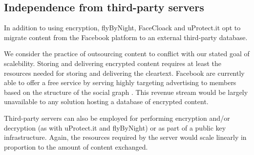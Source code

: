 \FloatBarrier
\subsection{Independence from third-party servers}


In addition to using encryption, flyByNight, FaceCloack and uProtect.it opt to migrate content from the Facebook platform to an external third-party database.

We consider the practice of outsourcing content to conflict with our stated goal of scalebility. Storing and delivering encrypted content requires at least the resources needed for storing and delivering the cleartext. Facebook are currently able to offer a free service by serving highly targeting advertising to members based on the structure of the social graph \cite{fb-ads}. This revenue stream would be largely unavailable to any solution hosting a database of encrypted content.


Third-party servers can also be employed for performing encryption and/or decryption (as with uProtect.it and flyByNight) or as part of a public key infrastructure. Again, the resources required by the server would scale linearly in proportion to the amount of content exchanged.


